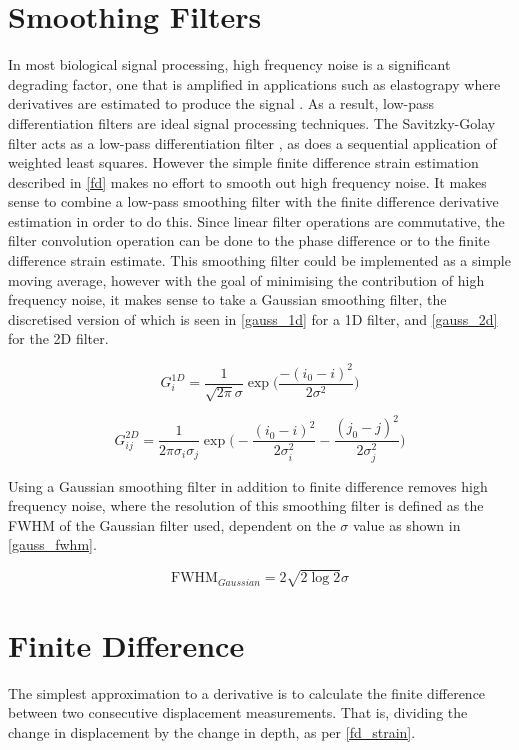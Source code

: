 \section{Smoothing Filters}
In most biological signal processing, high frequency noise is a significant degrading factor, one that is amplified in applications such as elastograpy where derivatives are estimated to produce the signal \cite{usui_digital_1982}. As a result, low-pass differentiation filters are ideal signal processing techniques. The Savitzky-Golay filter acts as a low-pass differentiation filter \cite{luo_axial_2004}, as does a sequential application of weighted least squares. However the simple finite difference strain estimation described in \autoref{fd} makes no effort to smooth out high frequency noise. It makes sense to combine a low-pass smoothing filter with the finite difference derivative estimation in order to do this. Since linear filter operations are commutative, the filter convolution operation can be done to the phase difference or to the finite difference strain estimate. This smoothing filter could be implemented as a simple moving average, however with the goal of minimising the contribution of high frequency noise, it makes sense to take a Gaussian smoothing filter, the discretised version of which is seen in \autoref{gauss_1d} for a 1D filter, and \autoref{gauss_2d} for the 2D filter.

\begin{equation}
	\label{gauss_1d}
	G^{1D}_i = \frac{1}{\sqrt{2\pi} \sigma} \exp{\bigg(\frac{-(i_0-i)^2}{2 \sigma^2}\bigg)}
\end{equation}

\begin{equation}
	\label{gauss_2d}
	G^{2D}_{ij} = \frac{1}{2\pi \sigma_i \sigma_j } \exp{ 
	\bigg( - \frac{(i_0 - i)^2}{2 \sigma_i^2} - \frac{(j_0 - j)^2}{2 \sigma_j^2} \bigg)}
\end{equation}

Using a Gaussian smoothing filter in addition to finite difference removes high frequency noise, where the resolution of this smoothing filter is defined as the FWHM of the Gaussian filter used, dependent on the $\sigma$ value as shown in \autoref{gauss_fwhm}.

\begin{equation}
	\label{gauss_fwhm}
	\text{FWHM}_{Gaussian} = 2 \sqrt{2 \log{2}} \sigma
\end{equation}

\section{Finite Difference}\label{fd}
The simplest approximation to a derivative is to calculate the finite difference between two consecutive displacement measurements. That is, dividing the change in displacement by the change in depth, as per \autoref{fd_strain}.

